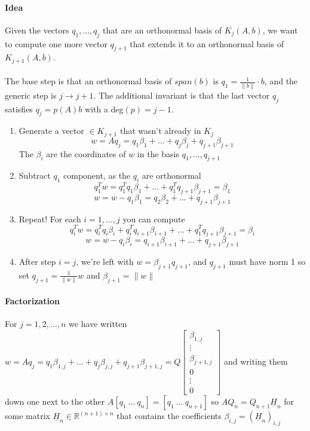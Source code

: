 \documentclass[10pt]{report}
\begin{document}
\paragraph{Idea} Given the vectors $q_1,\ldots,q_j$ that are an orthonormal basis of $K_j(A,b)$, we want to compute one more vector $q_{j+1}$ that extends it to an orthonormal basis of $K_{j+1}(A,b)$.\\\\
The base step is that an orthonormal basis of $span(b)$ is $q_1=\frac{1}{\|b\|}\cdot b$, and the generic step is $j\rightarrow j+1$. The additional invariant is that the last vector $q_j$ satisfies $q_j=p(A)b$ with a deg$(p)=j-1$.
\begin{enumerate}
	\item Generate a vector $\in K_{j+1}$ that wasn't already in $K_j$
	$$w = Aq_j = q_1\beta_1+\ldots + q_j\beta_j + q_{j+1}\beta_{j+1}$$
	The $\beta_i$ are the coordinates of $w$ in the basis $q_1,\ldots,q_{j+1}$
	\item Subtract $q_1$ component, as the $q_i$ are orthonormal
	$$q_1^Tw = q_1^Tq_1\beta_1+\ldots+q_1^Tq_{j+1}\beta_{j+1} = \beta_1$$
	$$w = w - q_1\beta_1 = q_2\beta_2 + \ldots + q_{j+1}\beta_{j+1}$$
	\item Repeat! For each $i=1,\ldots,j$ you can compute
	$$q_i^Tw = q_i^Tq_i\beta_i + q_i^Tq_{i+1}\beta_{i+1}+\ldots+q_1^Tq_{j+1}\beta_{j+1} = \beta_i$$
	$$w = w - q_i\beta_i = q_{i+1}\beta_{i+1} + \ldots + q_{j+1}\beta_{j+1}$$
	\item After step $i=j$, we're left with $w = \beta_{j+1}q_{j+1}$, and $q_{j+1}$ must have norm 1 so set $q_{j+1}=\frac{1}{\|w\|}w$ and $\beta_{j+1}= \|w\|$
\end{enumerate}
\paragraph{Factorization} For $j=1,2,\ldots,n$ we have written $w = Aq_j = q_1\beta_{1,j}+\ldots + q_j\beta_{j,j} + q_{j+1}\beta_{j+1,j} = Q\left[\begin{array}{c}
\beta_{1,j}\\\vdots\\\beta_{j+1,j}\\0\\\vdots\\0
\end{array}\right]$ and writing them down one next to the other $A[q_1\:\ldots\:q_n] = [q_1\:\ldots\:q_{n+1}]$ so $AQ_n = Q_{n+1}\underline{H}_n$ for some matrix $\underline{H}_n\in \mathbb{R}^{(n+1)\times n}$ that contains the coefficients $\beta_{i,j} = (\underline{H}_n)_{i,j}$
\end{document}
